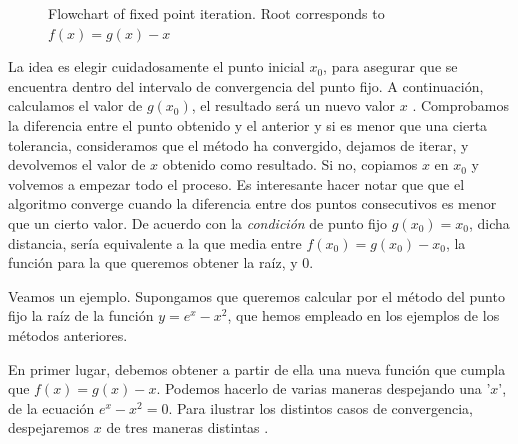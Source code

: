 \begin{paracol}{2}
\switchcolumn


\begin{figure}[h]
\centering
{}
\caption{Flowchart of fixed point iteration. Root corresponds to $f(x)=g(x)-x$}
\label{fig:fixedp}
\end{figure}


\switchcolumn

 La idea es elegir cuidadosamente el punto inicial $x_0$, para asegurar que se encuentra dentro del intervalo de convergencia del punto fijo.  A continuación, calculamos el valor de $g(x_0)$, el resultado será un nuevo valor  $x$ .  Comprobamos la diferencia entre el punto obtenido y el anterior y si es menor que una cierta tolerancia,  consideramos que el método ha convergido, dejamos de iterar, y devolvemos el valor de $x$ obtenido como resultado. Si no, copiamos $x$ en $x_0$ y volvemos a empezar todo el proceso. Es interesante hacer notar que que el algoritmo converge cuando la diferencia entre dos puntos consecutivos es menor que un cierto valor.  De acuerdo con la \emph{condición } de punto fijo $g(x_0)=x_0$, dicha distancia, sería equivalente a la que media entre $f(x_0)=g(x_0)-x_0$, la función para la que queremos obtener la raíz,   y $0$.

Veamos un ejemplo. Supongamos  que queremos calcular por el método del punto fijo la raíz de la  
función $y=e^x-x^2$, que hemos empleado en los ejemplos de los métodos anteriores.

En primer lugar, debemos obtener a partir de ella una nueva función que cumpla que $f(x)=g(x)-x$. Podemos hacerlo de varias maneras despejando una '$x$', de la ecuación $e^x-x^2=0$.  Para ilustrar los distintos casos de convergencia, despejaremos $x$ de tres maneras distintas .



\end{paracol}
